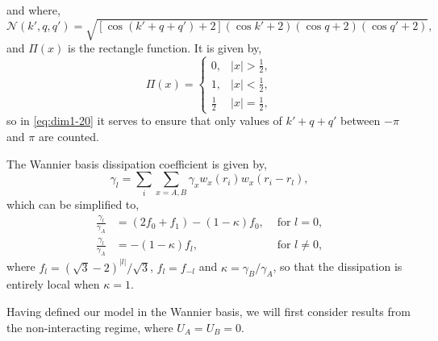 and where,
\begin{equation}
	\mathcal{N}(k',q,q') = \sqrt{\left[ \cos(k'+q+q') + 2\right](\cos k'+2)(\cos q+2)(\cos q'+2)},
	\label{eq:dim1-20}
\end{equation}
and \(\Pi(x)\) is the rectangle function. It is given by,
\begin{equation}
	\Pi(x) = \begin{cases}
	0, & |x| > \frac{1}{2}, \\
	1, & |x| < \frac{1}{2}, \\
	\frac{1}{2} & |x| = \frac{1}{2},
	\end{cases}
	\label{eq:dim1-24}
\end{equation}
so in \cref{eq:dim1-20} it serves to ensure that only values of \( k' + q + q' \) between \(-\pi\) and \(\pi\) are counted.

The Wannier basis dissipation coefficient is given by,
\begin{equation}
	\gamma_{l} = \sum_{i} \sum_{x=A,B} \gamma_{x}w_{x}(r_{i})w_{x}(r_{i} - r_{l}),
	\label{eq:dim1-21}
\end{equation}
which can be simplified to,
\begin{align}
	\frac{\gamma_{l}}{\gamma_{A}} &= (2f_{0} + f_{1}) - (1 - \kappa)f_{0}, &\text{ for }l=0, \label{eq:dim1-22} \\
	\frac{\gamma_{l}}{\gamma_{A}} &= -(1-\kappa)f_{l}, &\text{ for }l \neq 0, \label{eq:dim1-23}
\end{align}
where \(f_{l} = (\sqrt{3}-2)^{|l|}/\sqrt{3}\), \(f_{l}=f_{-l}\) and \(\kappa = \gamma_{B}/\gamma_{A}\), so that the dissipation is entirely local when \(\kappa = 1\).

Having defined our model in the Wannier basis, we will first consider results from the non-interacting regime, where \(U_{A} = U_{B} = 0\).


